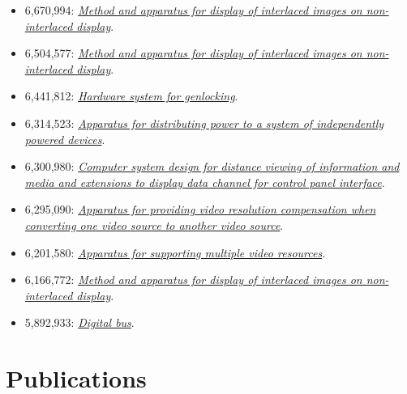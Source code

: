 \documentclass[10pt,letterpaper,oneside]{report}
\begin{document}
\begin{itemize}
  \item 6,670,994: \href{http://voltz.ws/resume/6670994.pdf}
    {\textit{Method and apparatus for display of interlaced images on
    non-interlaced display}}.

  \item 6,504,577: \href{http://voltz.ws/resume/6504577.pdf}
    {\textit{Method and apparatus for display of interlaced images on
    non-interlaced display}}.

  \item 6,441,812: \href{http://voltz.ws/resume/6441812.pdf}
    {\textit{Hardware system for genlocking}}.

  \item 6,314,523: \href{http://voltz.ws/resume/6314523.pdf}
    {\textit{Apparatus for distributing power to a system of independently
    powered devices}}.

  \item 6,300,980: \href{http://voltz.ws/resume/6300980.pdf}
    {\textit{Computer system design for distance viewing of information and
    media and extensions to display data channel for control panel interface}}.

  \item 6,295,090: \href{http://voltz.ws/resume/6295090.pdf}
    {\textit{Apparatus for providing video resolution compensation when
    converting one video source to another video source}}.

  \item 6,201,580: \href{http://voltz.ws/resume/6201580.pdf}
    {\textit{Apparatus for supporting multiple video resources}}.

  \item 6,166,772: \href{http://voltz.ws/resume/6166772.pdf}
    {\textit{Method and apparatus for display of interlaced images on
    non-interlaced display}}.

  \item 5,892,933: \href{http://voltz.ws/resume/5892933.pdf}
    {\textit{Digital bus}}.
\end{itemize}

\section{Publications}
\end{document}
